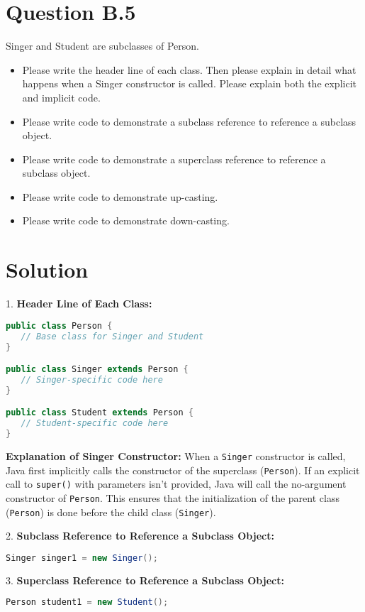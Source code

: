 \documentclass[12pt]{article}
\begin{document}
\newpage

\section*{Question B.5}
Singer and Student are subclasses of Person.
\begin{itemize}
  \item Please write the header line of each class. Then please explain in detail what happens when a Singer constructor is called. Please explain both the explicit and implicit code.
  \item Please write code to demonstrate a subclass reference to reference a subclass object.
  \item Please write code to demonstrate a superclass reference to reference a subclass object.
  \item Please write code to demonstrate up-casting.
  \item Please write code to demonstrate down-casting.
\end{itemize}

\section*{Solution}
1. \textbf{Header Line of Each Class:}
\begin{lstlisting}[language=Java]
public class Person {
   // Base class for Singer and Student
}

public class Singer extends Person {
   // Singer-specific code here
}

public class Student extends Person {
   // Student-specific code here
}
\end{lstlisting}

\textbf{Explanation of Singer Constructor:} When a \texttt{Singer} constructor is called, Java first implicitly calls the constructor of the superclass (\texttt{Person}). If an explicit call to \texttt{super()} with parameters isn't provided, Java will call the no-argument constructor of \texttt{Person}. This ensures that the initialization of the parent class (\texttt{Person}) is done before the child class (\texttt{Singer}).

2. \textbf{Subclass Reference to Reference a Subclass Object:}
\begin{lstlisting}[language=Java]
Singer singer1 = new Singer();
\end{lstlisting}

3. \textbf{Superclass Reference to Reference a Subclass Object:}
\begin{lstlisting}[language=Java]
Person student1 = new Student();
\end{lstlisting}
\end{document}
